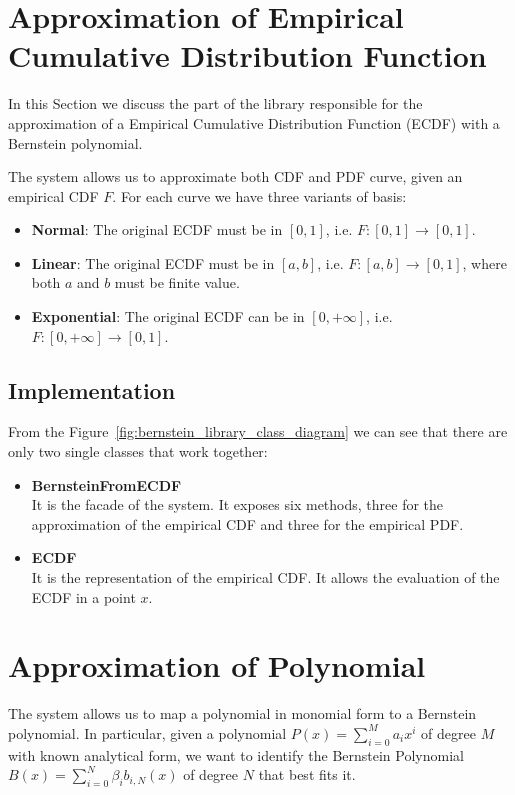 \section{Approximation of Empirical Cumulative Distribution Function}
In this Section we discuss the part of the library responsible for the approximation of a Empirical Cumulative Distribution Function (ECDF) with a Bernstein polynomial.

The system allows us to approximate both CDF and PDF curve, given an empirical CDF $F$. For each curve we have three variants of basis:
\begin{itemize}
    \item \textbf{Normal}: The original ECDF must be in $[0,1]$, i.e. $F:[0,1]\to[0,1]$.
    \item \textbf{Linear}: The original ECDF must be in $[a,b]$, i.e. $F:[a,b]\to[0,1]$, where both $a$ and $b$ must be finite value.
    \item \textbf{Exponential}: The original ECDF can be in $[0,+\infty]$, i.e. $F:[0,+\infty]\to[0,1]$.
\end{itemize}

\subsection{Implementation}
From the Figure~\ref{fig:bernstein_library_class_diagram} we can see that there are only two single classes that work together:
\begin{itemize}
    \item \textbf{BernsteinFromECDF} \\
        It is the facade of the system. It exposes six methods, three for the approximation of the empirical CDF and three for the empirical PDF.
    \item \textbf{ECDF} \\
        It is the representation of the empirical CDF. It allows the evaluation of the ECDF in a point $x$.
\end{itemize}

\section{Approximation of Polynomial}
The system allows us to map a polynomial in monomial form to a Bernstein polynomial. In particular, given a polynomial $\displaystyle P(x) = \sum_{i=0}^{M} a_i x^i$ of degree $M$ with known analytical form, we want to identify the Bernstein Polynomial $\displaystyle B(x) = \sum_{i=0}^{N} \beta_i b_{i,N}(x)$ of degree $N$ that best fits it.

